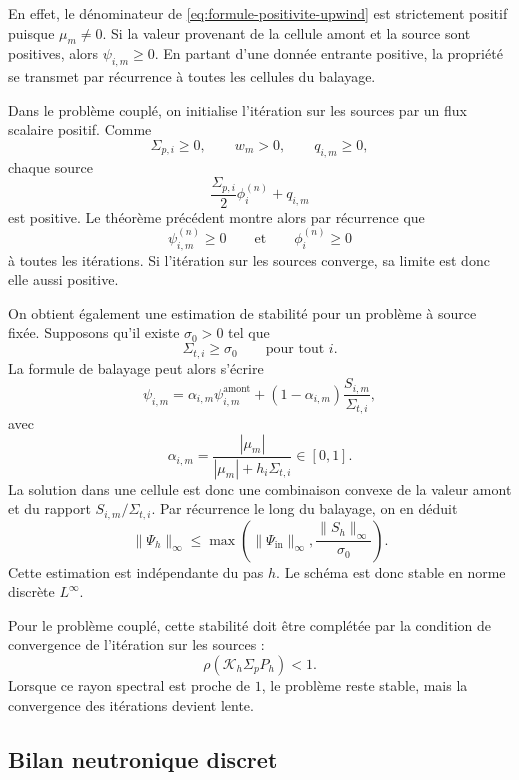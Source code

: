 \documentclass{article}
\begin{document}
En effet, le dénominateur de \eqref{eq:formule-positivite-upwind} est strictement positif puisque $\mu_m\neq0$. Si la valeur provenant de la cellule amont et la source sont positives, alors $\psi_{i,m}\geq0$. En partant d'une donnée entrante positive, la propriété se transmet par récurrence à toutes les cellules du balayage.

Dans le problème couplé, on initialise l'itération sur les sources par un flux scalaire positif. Comme
\[
    \Sigma_{p,i}\geq0, \qquad w_m>0, \qquad q_{i,m}\geq0,
\]
chaque source
\[
    \frac{\Sigma_{p,i}}{2}\phi_i^{(n)}+q_{i,m}
\]
est positive. Le théorème précédent montre alors par récurrence que
\[
    \psi_{i,m}^{(n)}\geq0
    \qquad\text{et}\qquad
    \phi_i^{(n)}\geq0
\]
à toutes les itérations. Si l'itération sur les sources converge, sa limite est donc elle aussi positive.

On obtient également une estimation de stabilité pour un problème à source fixée. Supposons qu'il existe $\sigma_0>0$ tel que
\[
    \Sigma_{t,i}\geq\sigma_0 \qquad\text{pour tout }i.
\]
La formule de balayage peut alors s'écrire
\[
    \psi_{i,m} = \alpha_{i,m}\psi_{i,m}^{\mathrm{amont}}
    + (1-\alpha_{i,m}) \frac{S_{i,m}}{\Sigma_{t,i}},
\]
avec
\[
    \alpha_{i,m} = \frac{|\mu_m|} {|\mu_m|+h_i\Sigma_{t,i}} \in[0,1].
\]
La solution dans une cellule est donc une combinaison convexe de la valeur amont et du rapport $S_{i,m}/\Sigma_{t,i}$. Par récurrence le long du balayage, on en déduit
\begin{equation}
    \|\Psi_h\|_{\infty}
    \leq \max \left(
        \|\Psi_{\mathrm{in}}\|_{\infty},
        \frac{\|S_h\|_{\infty}}{\sigma_0} \right).
    \label{eq:stabilite-Linf-upwind}
\end{equation}
Cette estimation est indépendante du pas $h$. Le schéma est donc stable en norme discrète $L^\infty$.

Pour le problème couplé, cette stabilité doit être complétée par la condition de convergence de l'itération sur les sources :
\[
    \rho\!\left( \mathcal K_h\Sigma_pP_h \right)<1.
\]
Lorsque ce rayon spectral est proche de $1$, le problème reste stable, mais la convergence des itérations devient lente.

\subsection {Bilan neutronique discret}
\end{document}
